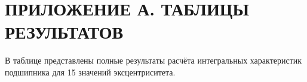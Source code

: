 \documentclass[14pt,a4paper]{extarticle}
\begin{document}

\setcounter{page}{2}

\renewcommand{\contentsname}{СОДЕРЖАНИЕ}
\tableofcontents
\newpage













\appendix
\renewcommand{\thetable}{А.\arabic{table}}
\setcounter{table}{0}

\section*{ПРИЛОЖЕНИЕ А. ТАБЛИЦЫ РЕЗУЛЬТАТОВ}
{}

В таблице представлены полные результаты расчёта интегральных характеристик подшипника для 15 значений эксцентриситета.
\end{document}
